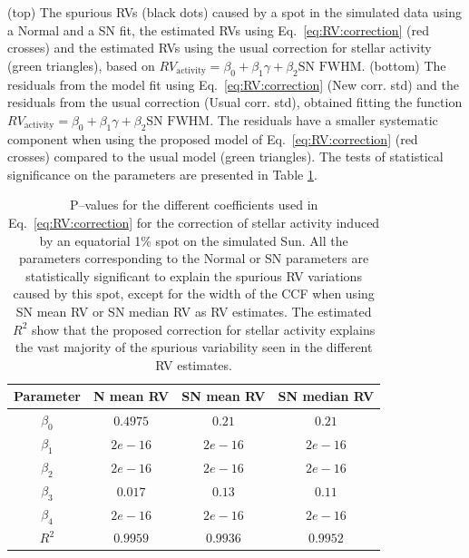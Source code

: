 \documentclass{aa}
\begin{document}
(top) The spurious RVs (black dots) caused by a spot in the simulated data using a Normal and a SN fit, the estimated RVs using Eq.~\ref{eq:RV:correction} (red crosses) and the estimated RVs using the usual correction for stellar activity (green triangles), based on $RV_{\text{activity}}=\beta_0+\beta_1 \gamma + \beta_2 \text{SN FWHM}$.
 (bottom) The residuals from the model fit using Eq.~\ref{eq:RV:correction} (New corr. std) and the residuals from the usual correction (Usual corr. std), obtained fitting the function $RV_{\text{activity}}=\beta_0+\beta_1 \gamma + \beta_2 \text{SN FWHM}$.  The residuals have a smaller systematic component when using the proposed model of 
  Eq.~\ref{eq:RV:correction} (red crosses) compared to the usual model (green triangles).
The tests of statistical significance on the parameters are presented in Table \ref{table:spot.test}.

\begin{table}
\begin{center}
\caption{P--values for the different coefficients used in Eq.~\ref{eq:RV:correction} for the correction of stellar activity induced by an equatorial 1\% spot on the simulated Sun. All the parameters corresponding to the Normal or SN parameters are statistically significant to explain the spurious RV variations caused by this spot, except for the width of the CCF when using SN mean RV or SN median RV as RV estimates. The estimated $R^{2}$ show that the proposed correction for stellar activity explains the vast majority of the spurious variability seen in the different RV estimates.}
\label{table:spot.test}
\begin{tabular}{|c|c|c|c|}
\hline
Parameter          & N mean RV         &   SN mean RV &   SN median RV \\
\hline
$\beta_{0}$            &    $0.4975$    & $0.21$ & $0.21$ \\
\hline
$\beta_{1}$            &    $2e-16$    & $2e-16$ & $2e-16$ \\
\hline
$\beta_{2}$            &     $2e-16$   &  $2e-16$ & $2e-16$\\
\hline
$\beta_{3}$            &     $0.017$   &  $0.13$ & $0.11$\\
\hline
$\beta_{4}$            &     $2e-16$   &  $2e-16$ & $2e-16$\\
\hline
$R^{2}$      &     $0.9959$    &  $0.9936$ & $0.9952$  \\
\hline
\end{tabular}
\end{center}
\end{table}
\end{document}
